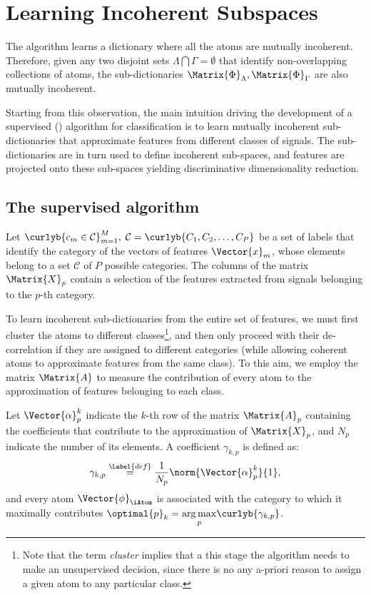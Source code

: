 \documentclass{article}
\def \fea{\Vector{x}} 	%
\def \Feas{\Matrix{X}} 	%
\def \iFea{n}	 		%
\def \nDim{N} 			%
\def \Dic{\Matrix{\Phi}} %
\def \iAto{k} 			%
\def \atom{\Vector{\phi}}%
\def \nFea{M}			%
\def \iFea{m}			%
\def \Coeff{\Matrix{A}} 	%
\def \coeff{\Vector{\alpha}}%
\def \cat{c} 			%
\def \Cat{\mathcal{C}} 	%
\def \uniCat{C} 			%
\def \iCat{p}  		%
\def \nCat{P} 		%
\def \definition{\overset{\Label{def}}{=}}	%
\begin{document}
\section{Learning Incoherent Subspaces}\label{sec:lis}
The  algorithm learns a dictionary where all the atoms are mutually incoherent. Therefore, given any two disjoint sets $\Lambda\bigcap\Gamma=\emptyset$ that identify non-overlapping collections of atoms, the sub-dictionaries $\Dic_{\Lambda}, \Dic_{\Gamma}$ are also mutually incoherent.

Starting from this observation, the main intuition driving the development of a supervised  () algorithm for classification is to learn mutually incoherent sub-dictionaries that approximate features from different classes of signals. The sub-dictionaries are in turn used to define incoherent sub-spaces, and features are projected onto these sub-spaces yielding discriminative dimensionality reduction. 
  
\subsection{The supervised  algorithm}\label{sec:iprclass}
Let $\curlyb{\cat_{\iFea}\in\Cat}_{\iFea=1}^{\nFea},\; \Cat=\curlyb{\uniCat_{1},\uniCat_{2},\dots,\uniCat_{\nCat}}$ be a set of labels that identify the category of the vectors of features $\fea_{\iFea}$, whose elements belong to a set $\Cat$ of $\nCat$ possible categories. The columns of the matrix $\Feas_{\iCat}$ contain a selection of the features extracted from signals belonging to the $\iCat$-th category.

To learn incoherent sub-dictionaries from the entire set of features, we must first cluster the atoms to different classes\footnote{Note that the term \emph{cluster} implies that a this stage the algorithm needs to make an unsupervised decision, since there is no any a-priori reason to assign a given atom to any particular class.}, and then only proceed with their de-correlation  if they are assigned to different categories (while allowing coherent atoms to approximate features from the same class). To this aim, we employ the matrix $\Coeff$ to measure the contribution of every atom to the approximation of features belonging to each class.

Let $\coeff_{\iCat}^{\iAto}$ indicate the $\iAto$-th row of the matrix $\Coeff_{\iCat}$ containing the coefficients that contribute to the approximation of $\Feas_{\iCat}$, and $\nDim_{\iCat}$ indicate the number of its elements. A coefficient $\gamma_{\iAto,\iCat}$ is defined as:
\begin{equation}
	\gamma_{\iAto,\iCat} \definition \frac{1}{\nDim_{\iCat}}\norm{\coeff_{\iCat}^{\iAto}}{1},
\end{equation}
and every atom $\atom_{\iAtom}$ is associated with the category to which it maximally contributes $\optimal{\iCat}_{\iAto} = \underset{\iCat}{\arg\max}\curlyb{\gamma_{\iAto,\iCat}}$. 
\end{document}
